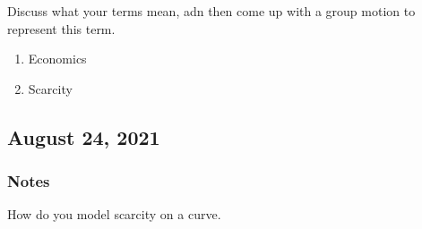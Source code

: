 \documentclass{scrreprt} %
\begin{document}
Discuss what your terms mean, adn then come up with a group motion to represent
this term.

\begin{enumerate}
	\item Economics
	\item Scarcity
\end{enumerate}

\subsection{August 24, 2021}

\subsubsection{Notes}

How do you model scarcity on a curve.
\end{document}
